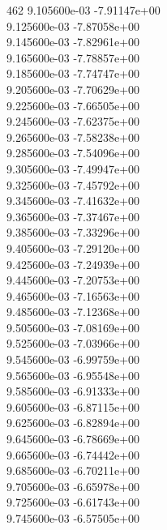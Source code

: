 462	9.105600e-03	-7.91147e+00	\\ 	9.125600e-03	-7.87058e+00	\\ 	9.145600e-03	-7.82961e+00	\\ 	9.165600e-03	-7.78857e+00	\\ 	9.185600e-03	-7.74747e+00	\\ 	9.205600e-03	-7.70629e+00	\\ 	9.225600e-03	-7.66505e+00	\\ 	9.245600e-03	-7.62375e+00	\\ 	9.265600e-03	-7.58238e+00	\\ 	9.285600e-03	-7.54096e+00	\\ 	9.305600e-03	-7.49947e+00	\\ 	9.325600e-03	-7.45792e+00	\\ 	9.345600e-03	-7.41632e+00	\\ 	9.365600e-03	-7.37467e+00	\\ 	9.385600e-03	-7.33296e+00	\\ 	9.405600e-03	-7.29120e+00	\\ 	9.425600e-03	-7.24939e+00	\\ 	9.445600e-03	-7.20753e+00	\\ 	9.465600e-03	-7.16563e+00	\\ 	9.485600e-03	-7.12368e+00	\\ 	9.505600e-03	-7.08169e+00	\\ 	9.525600e-03	-7.03966e+00	\\ 	9.545600e-03	-6.99759e+00	\\ 	9.565600e-03	-6.95548e+00	\\ 	9.585600e-03	-6.91333e+00	\\ 	9.605600e-03	-6.87115e+00	\\ 	9.625600e-03	-6.82894e+00	\\ 	9.645600e-03	-6.78669e+00	\\ 	9.665600e-03	-6.74442e+00	\\ 	9.685600e-03	-6.70211e+00	\\ 	9.705600e-03	-6.65978e+00	\\ 	9.725600e-03	-6.61743e+00	\\ 	9.745600e-03	-6.57505e+00	\\ \hline
